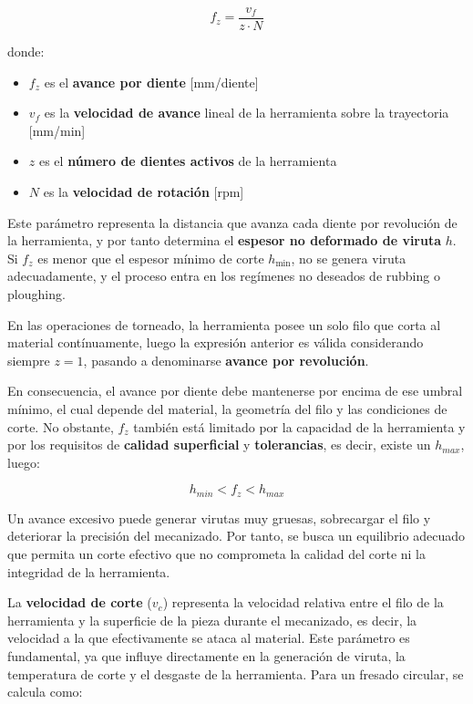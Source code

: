 \begin{equation}
	f_z = \frac{v_f}{z \cdot N}
\end{equation}

donde:
\begin{itemize}
	\item $f_z$ es el \textbf{avance por diente} [mm/diente]
	\item $v_f$ es la \textbf{velocidad de avance} lineal de la herramienta sobre la trayectoria [mm/min]
	\item $z$ es el \textbf{número de dientes activos} de la herramienta
	\item $N$ es la \textbf{velocidad de rotación} [rpm]
\end{itemize}

Este parámetro representa la distancia que avanza cada diente por revolución de la herramienta, y por tanto determina el \textbf{espesor no deformado de viruta} $h$. Si $f_z$ es menor que el espesor mínimo de corte $h_{\text{min}}$, no se genera viruta adecuadamente, y el proceso entra en los regímenes no deseados de rubbing o ploughing. 

En las operaciones de torneado, la herramienta posee un solo filo que corta al material contínuamente, luego la expresión anterior es válida considerando siempre $z=1$, pasando a denominarse \textbf{avance por revolución}. 

En consecuencia, el avance por diente debe mantenerse por encima de ese umbral mínimo, el cual depende del material, la geometría del filo y las condiciones de corte. No obstante, $f_z$ también está limitado por la capacidad de la herramienta y por los requisitos de \textbf{calidad superficial} y \textbf{tolerancias}, es decir, existe un $h_{max}$, luego:


\begin{equation}
	h_{min}<f_{z}<h_{max}
\end{equation}

 Un avance excesivo puede generar virutas muy gruesas, sobrecargar el filo y deteriorar la precisión del mecanizado. Por tanto, se busca un equilibrio adecuado que permita un corte efectivo que no comprometa la calidad del corte ni la integridad de la herramienta.
 
La \textbf{velocidad de corte} ($v_c$) representa la velocidad relativa entre el filo de la herramienta y la superficie de la pieza durante el mecanizado, es decir, la velocidad a la que efectivamente se ataca al material. Este parámetro es fundamental, ya que influye directamente en la generación de viruta, la temperatura de corte y el desgaste de la herramienta. Para un fresado circular, se calcula como:

